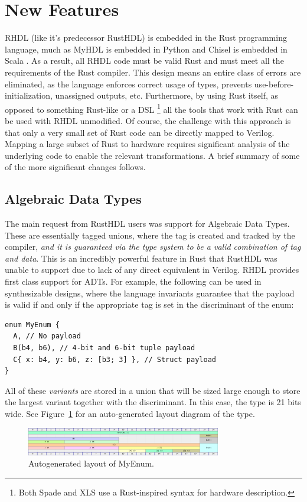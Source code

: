 \documentclass[sigplan,screen,sigconf]{acmart}
\begin{document}
\section{New Features}
RHDL (like it's predecessor RustHDL) is embedded in the Rust programming language, much as 
MyHDL is embedded in Python\cite{b3} and Chisel is embedded in Scala \cite{b2}.  As a result,
all RHDL code must be valid Rust and must meet all the requirements of the Rust compiler.  This design means an entire class of errors are eliminated, as the language enforces correct usage of types, prevents use-before-initialization, unassigned outputs, etc.  Furthermore, by using Rust itself, as opposed to something Rust-like or a DSL \footnote{Both Spade \cite{b1} and XLS \cite{b4} use a Rust-inspired syntax for hardware description.} all the tools that work with Rust can be used with RHDL unmodified.  Of course, the challenge with this approach is that only a very small set of Rust code can be directly mapped to Verilog.  Mapping a large subset of Rust to hardware requires significant analysis of the underlying code to enable the relevant transformations.  A brief summary of some of the more significant changes follows.

\subsection{Algebraic Data Types}
The main request from RustHDL users was support for Algebraic Data Types. These are essentially tagged unions, where the tag is created and tracked by the compiler, \emph{and it is guaranteed via the type system to be a valid combination of tag and data}.  This is an incredibly powerful feature in Rust that RustHDL was unable to support due to lack of any direct equivalent in Verilog.  RHDL provides first class support for ADTs. For example, the following can be used in synthesizable designs, where the language invariants guarantee that the payload is valid if and only if the appropriate tag is set in the discriminant of the enum:
\begin{verbatim}
enum MyEnum {
  A, // No payload
  B(b4, b6), // 4-bit and 6-bit tuple payload
  C{ x: b4, y: b6, z: [b3; 3] }, // Struct payload
}
\end{verbatim}
All of these \emph{variants} are stored in a union that will be sized large enough to store the largest variant together with the discriminant.  In this case, the type is 21 bits wide.  See Figure~\ref{fig:my_enum} for an auto-generated layout diagram of the type.
\begin{figure}[H]
  \centering
  \includegraphics[width=8.5cm]{my_enum.png}
  \caption{Autogenerated layout of MyEnum.} \label{fig:my_enum}
\end{figure}
\end{document}

